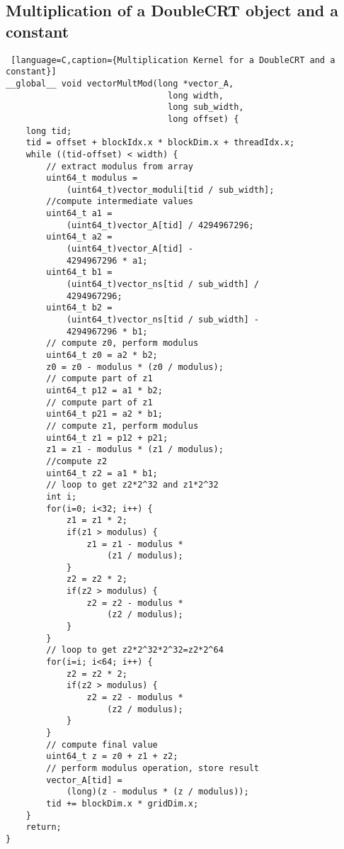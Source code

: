 \subsection{Multiplication of a DoubleCRT object and a constant}
\begin{lstlisting} [language=C,caption={Multiplication Kernel for a DoubleCRT and a constant}]
__global__ void vectorMultMod(long *vector_A, 
                                long width, 
                                long sub_width, 
                                long offset) {
	long tid;
	tid = offset + blockIdx.x * blockDim.x + threadIdx.x;
	while ((tid-offset) < width) {
	    // extract modulus from array
		uint64_t modulus = 
		    (uint64_t)vector_moduli[tid / sub_width];
        //compute intermediate values
		uint64_t a1 = 
		    (uint64_t)vector_A[tid] / 4294967296;
		uint64_t a2 = 
		    (uint64_t)vector_A[tid] - 
		    4294967296 * a1;
		uint64_t b1 = 
		    (uint64_t)vector_ns[tid / sub_width] / 
		    4294967296;
		uint64_t b2 = 
		    (uint64_t)vector_ns[tid / sub_width] - 
		    4294967296 * b1;
        // compute z0, perform modulus
		uint64_t z0 = a2 * b2;
		z0 = z0 - modulus * (z0 / modulus);
        // compute part of z1
		uint64_t p12 = a1 * b2;
        // compute part of z1
		uint64_t p21 = a2 * b1;
        // compute z1, perform modulus
		uint64_t z1 = p12 + p21;
		z1 = z1 - modulus * (z1 / modulus);
		//compute z2
		uint64_t z2 = a1 * b1;
        // loop to get z2*2^32 and z1*2^32
		int i;
		for(i=0; i<32; i++) {
			z1 = z1 * 2;
			if(z1 > modulus) {
				z1 = z1 - modulus * 
				    (z1 / modulus);
			}
			z2 = z2 * 2;
			if(z2 > modulus) {
				z2 = z2 - modulus * 
				    (z2 / modulus);
			}
		}
        // loop to get z2*2^32*2^32=z2*2^64
		for(i=i; i<64; i++) {
			z2 = z2 * 2;
			if(z2 > modulus) {
				z2 = z2 - modulus * 
				    (z2 / modulus);
			}
		}
        // compute final value
		uint64_t z = z0 + z1 + z2;
		// perform modulus operation, store result
		vector_A[tid] = 
		    (long)(z - modulus * (z / modulus));
		tid += blockDim.x * gridDim.x;
	}
	return;
}
\end{lstlisting}